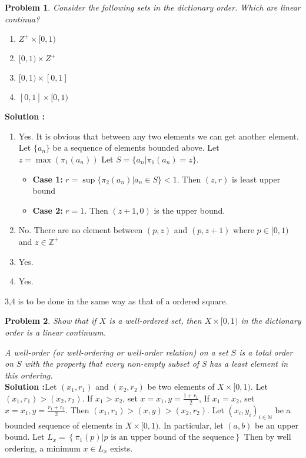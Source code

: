 \documentclass{article}
\newtheorem{problem}{Problem}
\numberwithin{problem}{section}
\begin{document}
\begin{tcolorbox}
\begin{problem}
Consider the following sets in the dictionary order. Which are linear continua?
\begin{enumerate}
    \item  $Z^+ \times [0, 1)$
    \item $[0, 1) \times Z^+$
    \item $[0, 1) \times [0, 1]$
    \item $[0, 1]\times[0, 1)$
\end{enumerate}
\end{problem}
\end{tcolorbox}
\textbf{Solution :}
\begin{enumerate}
    \item Yes. It is obvious that between any two elements we can get another element. Let $\{a_n\}$ be a sequence of elements bounded above. Let $z=\max\left(\pi_1(a_n)\right)$ Let $S=\{a_n|\pi_1(a_n)=z\}$.
    \begin{itemize}
        \item \textbf{Case 1:} $r=\sup\{\pi_2(a_n)|a_n\in S\}<1$. Then $(z,r)$ is least upper bound
        \item \textbf{Case 2:} $r=1$. Then $(z+1,0)$ is the upper bound.
    \end{itemize}
    \item No. There are no element between $(p,z)$ and $(p,z+1)$ where $p\in[0,1)$ and $z\in\mathbb Z^+$
    \item Yes. 
    \item Yes.
\end{enumerate}
3,4 is to be done in the same way as that of a ordered square.
\begin{tcolorbox}
\begin{problem}
Show that if $X$ is a well-ordered set, then $X \times [0, 1)$ in the dictionary order is a
linear continuum.
\end{problem}
\end{tcolorbox}
\textit{A well-order (or well-ordering or well-order relation) on a set $S$ is a total order on $S$ with the property that every non-empty subset of S has a least element in this ordering.}\\
\textbf{Solution :}Let $(x_1,r_1)$ and $(x_2,r_2)$ be two elements of $X\times [0,1)$. Let $(x_1,r_1)>(x_2,r_2)$. If $x_1>x_2$, set $x=x_1,y=\frac{1+r_1}{2}$, If $x_1=x_2$, set $x=x_1,y=\frac{r_1+r_2}{2}$. Then $(x_1,r_1)>(x,y)>(x_2,r_2)$. Let $(x_i,y_i)_{i\in\mathbb N}$ be a bounded sequence of elements in $X\times [0,1)$. In particular, let $(a,b)$ be an upper bound. Let $L_x=\left\{\pi_1(p)|\text{$p$ is an upper bound of the sequence}\right\}$ Then by well ordering, a minimum $x\in L_x$ exists.
\end{document}
